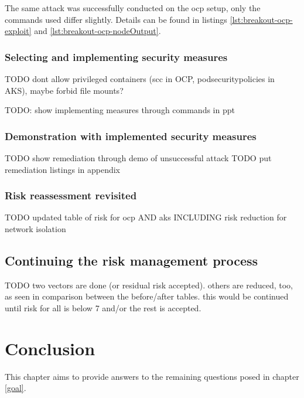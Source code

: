 The same attack was successfully conducted on the \gls{ocp} setup, only the commands used differ slightly. Details can be found in listings \ref{lst:breakout-ocp-exploit} and \ref{lst:breakout-ocp-nodeOutput}.

\subsection{Selecting and implementing security measures} \label{measures2}

TODO dont allow privileged containers (scc in OCP, podsecuritypolicies in AKS), maybe forbid file mounts?

TODO: show implementing measures through commands in ppt

\subsection{Demonstration with implemented security measures}

TODO show remediation through demo of unsuccessful attack
TODO put remediation listings in appendix

\subsection{Risk reassessment revisited} \label{reassess2}

TODO updated table of risk for ocp AND aks INCLUDING risk reduction for network isolation

\section{Continuing the risk management process}


TODO two vectors are done (or residual risk accepted). others are reduced, too, as seen in comparison between the before/after tables. this would be continued until risk for all is below 7 and/or the rest is accepted.

\chapter{Conclusion}
This chapter aims to provide answers to the remaining questions posed in chapter \ref{goal}.

